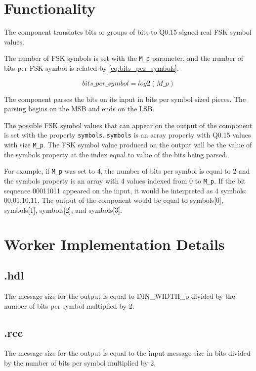 \section*{Functionality}
\begin{flushleft}
	The \Comp{} component translates bits or groups of bits to Q0.15 signed real FSK symbol values.\medskip

	The number of FSK symbols is set with the \verb+M_p+ parameter, and the number of bits per FSK symbol is related by \ref{eq:bits_per_symbols}.

	\begin{equation} \label{eq:bits_per_symbols}
  		bits\_per\_symbol = log2(M\_p)
	\end{equation}

	The \Comp{} component parses the bits on its input in bits per symbol sized pieces. The parsing begins on the MSB and ends on the LSB.\medskip

	The possible FSK symbol values that can appear on the output of the component is set with the property \verb+symbols+. \verb+symbols+ is an array property with Q0.15 values with size \verb+M_p+. The FSK symbol value produced on the output will be the value of the symbols property at the index equal to value of the bits being parsed.\medskip

	For example, if \verb+M_p+ was set to 4, the number of bits per symbol is equal to 2 and the symbols property is an array with 4 values indexed from 0 to \verb+M_p+. If the bit sequence 00011011 appeared on the input, it would be interpreted as 4 symbols: 00,01,10,11. The output of the component would be equal to symbols[0], symbols[1], symbols[2], and symbols[3].\medskip

\end{flushleft}

\section*{Worker Implementation Details}
\subsection*{\comp.hdl}
The message size for the output is equal to DIN\_WIDTH\_p divided by the number of bits per symbol multiplied by 2.
\subsection*{\comp.rcc}
The message size for the output is equal to the input message size in bits divided by the number of bits per symbol multiplied by 2.

